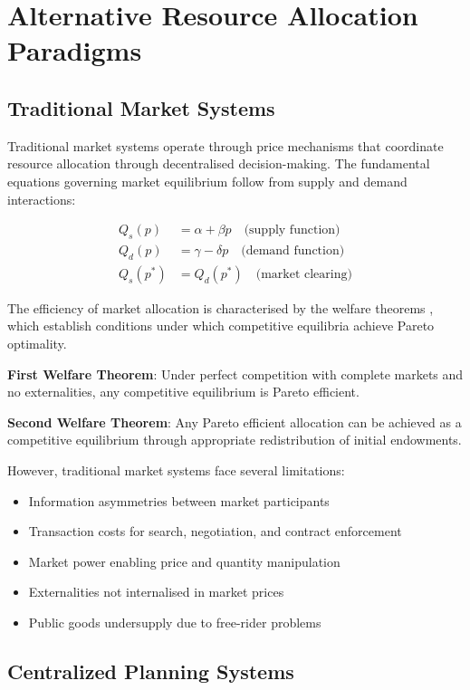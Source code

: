 \documentclass[12pt,a4paper]{article}
\begin{document}
\section{Alternative Resource Allocation Paradigms}

\subsection{Traditional Market Systems}

Traditional market systems operate through price mechanisms that coordinate resource allocation through decentralised decision-making. The fundamental equations governing market equilibrium follow from supply and demand interactions:

\begin{align}
Q_s(p) &= \alpha + \beta p \quad \text{(supply function)} \\
Q_d(p) &= \gamma - \delta p \quad \text{(demand function)} \\
Q_s(p^*) &= Q_d(p^*) \quad \text{(market clearing)}
\end{align}

The efficiency of market allocation is characterised by the welfare theorems \cite{samuelson1947,debreu1959}, which establish conditions under which competitive equilibria achieve Pareto optimality.

\textbf{First Welfare Theorem}: Under perfect competition with complete markets and no externalities, any competitive equilibrium is Pareto efficient.

\textbf{Second Welfare Theorem}: Any Pareto efficient allocation can be achieved as a competitive equilibrium through appropriate redistribution of initial endowments.

However, traditional market systems face several limitations:
\begin{itemize}
\item Information asymmetries between market participants
\item Transaction costs for search, negotiation, and contract enforcement
\item Market power enabling price and quantity manipulation
\item Externalities not internalised in market prices
\item Public goods undersupply due to free-rider problems
\end{itemize}

\subsection{Centralized Planning Systems}
\end{document}
